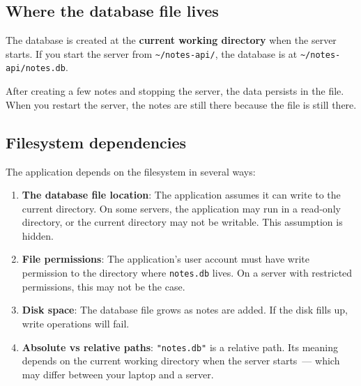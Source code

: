 \subsection*{Where the database file lives}\label{06-local-dependencies:where-the-database-file-lives}

The database is created at the \textbf{current working directory} when the server starts. If you start the server from \texttt{\textasciitilde{}/notes-api/}, the database is at \texttt{\textasciitilde{}/}\allowbreak{}\texttt{notes-api/}\allowbreak{}\texttt{notes.db}.

\begin{codebox}[short]

\begin{Shaded}
\begin{Highlighting}[]

 
\end{Highlighting}
\end{Shaded}

\end{codebox}

\noindent{}After creating a few notes and stopping the server, the data persists in the file. When you restart the server, the notes are still there because the file is still there.

\subsection*{Filesystem dependencies}\label{06-local-dependencies:filesystem-dependencies}

The application depends on the filesystem in several ways:

\begin{enumerate}
\def\labelenumi{\arabic{enumi}.}
\item
  \textbf{The database file location}: The application assumes it can write to the current directory. On some servers, the application may run in a read-only directory, or the current directory may not be writable. This assumption is hidden.
\item
  \textbf{File permissions}: The application's user account must have write permission to the directory where \texttt{notes.db} lives. On a server with restricted permissions, this may not be the case.
\item
  \textbf{Disk space}: The database file grows as notes are added. If the disk fills up, write operations will fail.
\item
  \textbf{Absolute vs relative paths}: \texttt{"notes.db"} is a relative path. Its meaning depends on the current working directory when the server starts~--- which may differ between your laptop and a server.
\end{enumerate}

